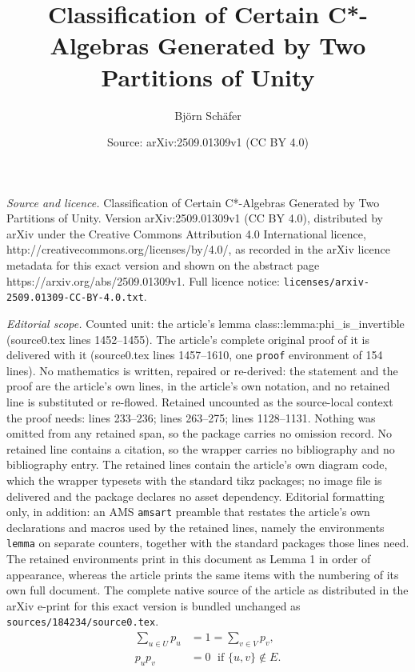 \documentclass[10pt,a4paper]{amsart}
\title{Classification of Certain C*-Algebras Generated by Two Partitions of Unity}
\author{Bj\"orn Sch\"afer}
\date{Source: arXiv:2509.01309v1 (CC BY 4.0)}
\begin{document}
\maketitle

\noindent\emph{Source and licence.} Classification of Certain C*-Algebras Generated by Two Partitions of Unity. Version arXiv:2509.01309v1 (CC BY 4.0), distributed by arXiv under the Creative Commons Attribution 4.0 International licence, http://creativecommons.org/licenses/by/4.0/, as recorded in the arXiv licence metadata for this exact version and shown on the abstract page https://arxiv.org/abs/2509.01309v1. Full licence notice: \texttt{licenses/arxiv-2509.01309-CC-BY-4.0.txt}.\par\smallskip

\noindent\textit{Editorial scope.} Counted unit: the article's lemma class::lemma:phi\_is\_invertible (source0.tex lines 1452--1455). The article's complete original proof of it is delivered with it (source0.tex lines 1457--1610, one \texttt{proof} environment of 154 lines). No mathematics is written, repaired or re-derived: the statement and the proof are the article's own lines, in the article's own notation, and no retained line is substituted or re-flowed.  Retained uncounted as the source-local context the proof needs: lines 233--236; lines 263--275; lines 1128--1131.  Nothing was omitted from any retained span, so the package carries no omission record.  No retained line contains a citation, so the wrapper carries no bibliography and no bibliography entry.  The retained lines contain the article's own diagram code, which the wrapper typesets with the standard tikz packages; no image file is delivered and the package declares no asset dependency.  Editorial formatting only, in addition: an AMS \texttt{amsart} preamble that restates the article's own declarations and macros used by the retained lines, namely the environments \texttt{lemma} on separate counters, together with the standard packages those lines need.  The retained environments print in this document as Lemma 1 in order of appearance, whereas the article prints the same items with the numbering of its own full document.  The complete native source of the article as distributed in the arXiv e-print for this exact version is bundled unchanged as \texttt{sources/184234/source0.tex}.
    \begin{align}
        \sum_{u \in U} p_u &= 1 = \sum_{v \in V} p_v,        \tag{GP1} \label{bga::eq:partition_relation} \\
        p_u p_v &= 0 \; \text{ if } \{u, v\} \not \in E.     \tag{GP2} \label{bga::eq:orthogonality_relation}
    \end{align}
\end{document}
